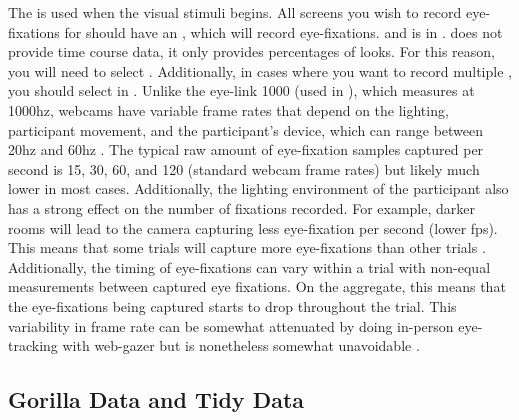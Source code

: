 The  is used when the visual stimuli begins. All screens you wish to record eye-fixations for should have an , which will record eye-fixations.  and  is in .  does not provide time course data, it only provides percentages of looks. For this reason, you will need to select . Additionally, in cases where you want to record multiple , you should select   in  . Unlike the eye-link 1000 (used in \parencite{Porretta_et_al_2020}), which measures at 1000hz, webcams have variable frame rates that depend on the lighting, participant movement, and the participant's device, which can range between 20hz and 60hz \parencite{Vos_2017}. The typical raw amount of eye-fixation samples captured per second is 15, 30, 60, and 120 (standard webcam frame rates) but likely much lower in most cases. Additionally, the lighting environment of the participant also has a strong effect on the number of fixations recorded. For example, darker rooms will lead to the camera capturing less eye-fixation per second (lower fps). This means that some trials will capture more eye-fixations than other trials \parencite{Prystauka_Altmann_Rothman_2023}. Additionally, the timing of eye-fixations can vary within a trial with non-equal measurements between captured eye fixations. On the aggregate, this means that the eye-fixations being captured starts to drop throughout the trial. This variability in frame rate can be somewhat attenuated by doing in-person eye-tracking with web-gazer but is nonetheless somewhat unavoidable \parencite[e.g., ][]{Papoutsaki}. 

\subsection{Gorilla Data and Tidy Data}

